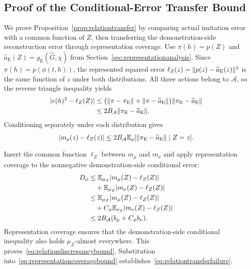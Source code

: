 \subsection{Proof of the Conditional-Error Transfer Bound}
\label{app:relationtransfer}
We prove Proposition~\ref{prop:relationtransfer} by comparing actual imitation error with a common function of $Z$, then transferring the demonstration-side reconstruction error through representation coverage.
Use $\pi(h)=p(Z)$ and $\widehat a_{\mathrm E}(Z)=g_{\mathrm E}(\widehat G,\chi)$ from Section~\ref{sec:representationanalysis}.
Since $\pi(h)=p(\phi(t,h))$, the represented squared error
$\ell_Z(z)=\lVert p(z)-\widehat a_{\mathrm E}(z)\rVert^2$ is the same function of $z$ under both distributions.
All three actions belong to $\mathcal A$, so the reverse triangle inequality yields
\begin{equation}
 \begin{aligned}
 |e(h)^2-\ell_Z(Z)|
 &\le\bigl(\lVert\pi-\pi_{\mathrm E}\rVert
       +\lVert\pi-\widehat a_{\mathrm E}\rVert\bigr)
       \lVert\pi_{\mathrm E}-\widehat a_{\mathrm E}\rVert\\
 &\le 2B_{\mathcal A}\lVert\pi_{\mathrm E}-\widehat a_{\mathrm E}\rVert.
 \end{aligned}
 \label{eq:appsquarederrorperturbation}
\end{equation}
Conditioning separately under each distribution gives
\begin{equation}
 |m_\rho(z)-\ell_Z(z)|
 \le 2B_{\mathcal A}
 \mathbb E_\rho[\lVert\pi_{\mathrm E}-\widehat a_{\mathrm E}\rVert\mid Z=z].
 \label{eq:appconditionalexpertapprox}
\end{equation}

Insert the common function $\ell_Z$ between $m_\mu$ and $m_\nu$ and apply representation coverage to the nonnegative demonstration-side conditional error:
\begin{equation}
 \begin{aligned}
 D_\phi
 &\le\mathbb E_{\mu_Z}|m_\mu(Z)-\ell_Z(Z)|\\
 &\quad+\mathbb E_{\mu_Z}|m_\nu(Z)-\ell_Z(Z)|\\
 &\le\mathbb E_{\mu_Z}|m_\mu(Z)-\ell_Z(Z)|\\
 &\quad+C_\phi\mathbb E_{\nu_Z}|m_\nu(Z)-\ell_Z(Z)|\\
 &\le 2B_{\mathcal A}(b_\mu+C_\phi b_\nu).
 \end{aligned}
 \label{eq:apprelationdiscrepancy}
\end{equation}
Representation coverage ensures that the demonstration-side conditional inequality also holds $\mu_Z$-almost everywhere.
This proves~\eqref{eq:relationdiscrepancybound}.
Substitution into~\eqref{eq:representationcoveragebound} establishes~\eqref{eq:relationtransferfailure}.

